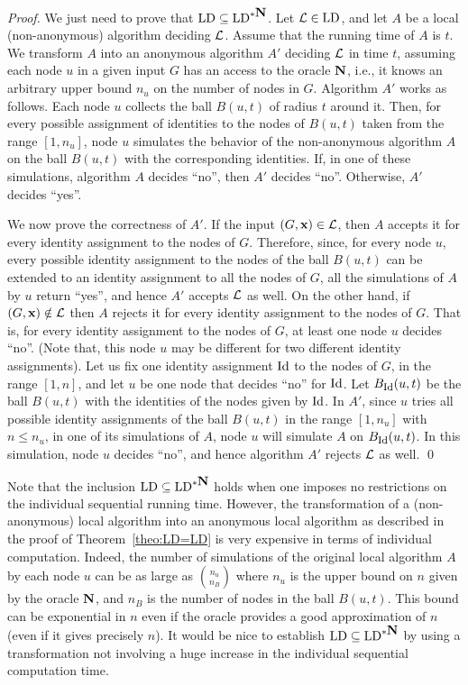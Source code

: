\documentclass{llncs}
\newcommand{\inp}{\mbox{\rm\bf x}}
\newcommand{\id}{\mbox{\rm Id}}
\newcommand{\LD}{\mbox{\rm LD}}
\newcommand{\up}{\mbox{\bf N}}
\def\cL{{\cal L}}
\begin{document}
\begin{proof}
We just need to prove that $\LD\subseteq\LD^{*\up}$. Let $\cL\in\LD$, and let $A$ be a local (non-anonymous) algorithm deciding $\cL$. Assume that the running time of $A$ is $t$. We transform $A$ into an anonymous algorithm $A'$ deciding $\cL$ in time $t$,  assuming each node $u$ in a given input $G$ has an access to the oracle $\up$, i.e., it knows an arbitrary upper bound $n_u$ on the number of nodes in $G$. 
Algorithm $A'$ works as follows. Each node $u$ collects the ball $B(u,t)$ of radius $t$ around it. Then, for every possible assignment of identities to the nodes of $B(u,t)$  taken from the range $[1,n_u]$, node $u$ simulates the behavior of the non-anonymous algorithm $A$ on the ball $B(u,t)$ with the corresponding identities. If, in one of these simulations, algorithm $A$ decides ``no'', then $A'$ decides ``no''. Otherwise, $A'$ decides ``yes''. 

We now prove the correctness of $A'$. If the input $(G,\inp)\in\cL$, then $A$ accepts it for every identity assignment to the nodes of $G$. Therefore, since, for every node $u$, every possible identity assignment to the nodes of the ball $B(u,t)$ can be extended to an  identity assignment to all the nodes of $G$, all the simulations of $A$ by $u$ return ``yes'', and hence $A'$ accepts $\cL$ as well. On the other hand, if  $(G,\inp)\notin\cL$ then $A$ rejects it for every identity assignment to the nodes of $G$. That is, for every identity assignment to the nodes of $G$, at least one node $u$ decides ``no''. (Note that, this node $u$ may be different for two different identity assignments). Let us fix one identity assignment $\id$ to the nodes of $G$, in the range $[1,n]$, and let $u$ be one node that decides ``no'' for $\id$. Let $B_{\mbox{\footnotesize $\id$}}(u,t)$ be the ball $B(u,t)$ with the identities of the nodes given by $\id$. In $A'$, since $u$ tries all possible identity assignments of the ball $B(u,t)$ in the range $[1,n_u]$ with $n\leq n_u$, in one of its simulations of $A$, node $u$ will simulate $A$ on $B_{\mbox{\footnotesize $\id$}}(u,t)$. In this simulation, node $u$ decides ``no'', and hence algorithm $A'$ rejects $\cL$ as well. 
\qed
\end{proof}

Note that the inclusion $\LD\subseteq\LD^{*\up}$ holds when one imposes no restrictions on the individual sequential running time. However, the transformation of a (non-anonymous) local algorithm into an anonymous local algorithm as described in the proof of Theorem~\ref{theo:LD=LD} is very expensive in terms of individual computation. Indeed, the number of simulations of the original local algorithm $A$ by each node $u$ can be as large as $n_u \choose n_B$ where $n_u$ is the upper bound on $n$ given by the oracle $\up$, and $n_B$ is the number of nodes in the ball $B(u,t)$. This bound can be exponential in $n$ even if the oracle provides a good approximation of $n$ (even if it gives precisely $n$). It would be nice to establish $\LD\subseteq\LD^{*\up}$ by using a transformation not involving a huge increase in the individual sequential computation time. 
\end{document}
